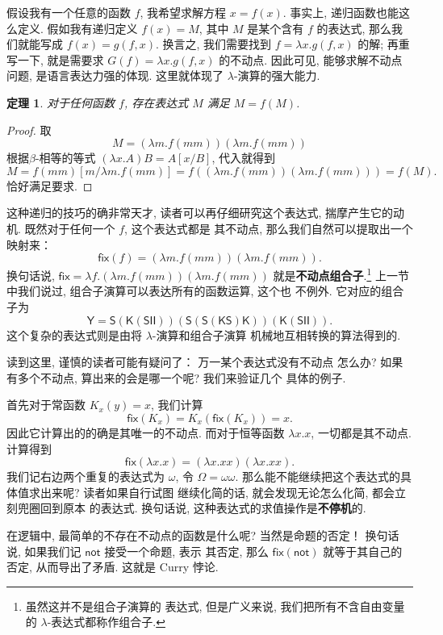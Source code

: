 \documentclass[UTF8]{ctexbook}
\newcommand{\cons}[1]{\textsf{#1}}
\theoremstyle{plain}
\newtheorem{theorem}{定理}[chapter]
\theoremstyle{definition}
\theoremstyle{remark}
\begin{document}
假设我有一个任意的函数 \(f\), 我希望求解方程 \(x = f(x)\).
事实上, 递归函数也能这么定义. 假如我有递归定义 \(f(x) = M\),
其中 \(M\) 是某个含有 \(f\) 的表达式, 那么我们就能写成
\(f(x) = g(f,x)\). 换言之, 我们需要找到 \(f = \lambda x. g(f,x)\)
的解; 再重写一下, 就是需要求 \(G(f) = \lambda x. g(f,x)\)
的不动点. 因此可见, 能够求解不动点问题, 是语言表达力强的体现.
这里就体现了 \(\lambda\)-演算的强大能力.

\begin{theorem}
对于任何函数 \(f\),
存在表达式 \(M\) 满足 \(M=f(M)\).
\end{theorem}
\begin{proof}
取
\[M = (\lambda m. f(mm))(\lambda m. f(mm))\]
根据\(\beta\)-相等的等式 \((\lambda x. A)B = A[x/B]\),
代入就得到
\[M = f(mm)[m/\lambda m.f(mm)]
= f((\lambda m. f(mm))(\lambda m.f(mm)))
= f(M).\]
恰好满足要求.
\end{proof}
这种递归的技巧的确非常天才, 读者可以再仔细研究这个表达式,
揣摩产生它的动机. 既然对于任何一个 \(f\), 这个表达式都是
其不动点, 那么我们自然可以提取出一个映射来：
\[\cons{fix}(f) = (\lambda m. f(mm)) (\lambda m. f(mm)).\]
换句话说, \(\cons{fix} = \lambda f. (\lambda m. f(mm)) (\lambda m. f(mm))\)
就是\textbf{不动点组合子}.\footnote{虽然这并不是组合子演算的
表达式, 但是广义来说, 我们把所有不含自由变量
的 \(\lambda\)-表达式都称作组合子.}
上一节中我们说过, 组合子演算可以表达所有的函数运算, 这个也
不例外. 它对应的组合子为
\[\cons{Y} = \cons{S}(\cons{K}(\cons{S}\cons{I}\cons{I}))
(\cons{S}(\cons{S}(\cons{K}\cons{S})\cons{K}))
(\cons{K}(\cons{S}\cons{I}\cons{I})).\]
这个复杂的表达式则是由将 \(\lambda\)-演算和组合子演算
机械地互相转换的算法得到的.

读到这里, 谨慎的读者可能有疑问了： 万一某个表达式没有不动点
怎么办? 如果有多个不动点, 算出来的会是哪一个呢? 我们来验证几个
具体的例子.

首先对于常函数 \(K_x(y) = x\), 我们计算
\[\cons{fix}(K_x) = K_x(\cons{fix}(K_x)) = x.\]
因此它计算出的的确是其唯一的不动点. 而对于恒等函数
\(\lambda x. x\), 一切都是其不动点. 计算得到
\[\cons{fix}(\lambda x.x) = (\lambda x.xx)(\lambda x.xx).\]
我们记右边两个重复的表达式为 \(\omega\), 令 \(\Omega = \omega\omega\).
那么能不能继续把这个表达式的具体值求出来呢? 读者如果自行试图
继续化简的话, 就会发现无论怎么化简, 都会立刻兜圈回到原本
的表达式. 换句话说, 这种表达式的求值操作是\textbf{不停机}的.

在逻辑中, 最简单的不存在不动点的函数是什么呢? 当然是命题的否定！
换句话说, 如果我们记 \(\cons{not}\) 接受一个命题, 表示
其否定, 那么 \(\cons{fix}(\cons{not})\) 就等于其自己的否定,
从而导出了矛盾. 这就是 Curry 悖论.
\end{document}
